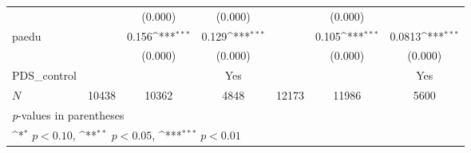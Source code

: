 \documentclass{beamer}
\def\sym#1{\ifmmode^{#1}\else\(^{#1}\)\fi}
\begin{document}
\begin{frame}[shrink=38]
\begin{tabular}{l*{6}c}
                &                     &     (0.000)         &     (0.000)         &                     &     (0.000)         &                     \\
    [1em]
    paedu       &                     &       0.156\sym{***}&       0.129\sym{***}&                     &       0.105\sym{***}&      0.0813\sym{***}\\
                &                     &     (0.000)         &     (0.000)         &                     &     (0.000)         &     (0.000)         \\
    [1em]
    PDS\_control  &                     &                    &      Yes             &                   &                 &      Yes \\
                
    \hline
    \(N\)       &       10438         &       10362         &        4848         &       12173         &       11986         &        5600         \\
    \bottomrule
    \multicolumn{7}{l}{\footnotesize \textit{p}-values in parentheses} \\
    \multicolumn{7}{l}{\footnotesize \sym{*} \(p<0.10\), \sym{**} \(p<0.05\), \sym{***} \(p<0.01\)} \\
\end{tabular}

\end{frame}
\end{document}
